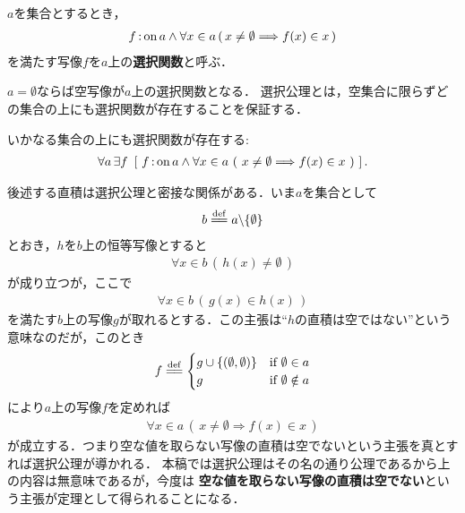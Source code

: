 	
	\begin{screen}
		\begin{dfn}[選択関数]
			$a$を集合とするとき，
			\begin{align}
				f \operatorname*{:on} a \wedge \forall x \in a\, (\, x \neq \emptyset \Longrightarrow f(x) \in x\, )
			\end{align}
			を満たす写像$f$を$a$上の{\bf 選択関数}と呼ぶ．
		\end{dfn}
	\end{screen}
	
	$a = \emptyset$ならば空写像が$a$上の選択関数となる．
	選択公理とは，空集合に限らずどの集合の上にも選択関数が存在することを保証する．
	
	\begin{screen}
		\begin{axm}[選択公理]
			いかなる集合の上にも選択関数が存在する:
			\begin{align}
				\forall a\, \exists f\ \left[\ 
				f \fon a \wedge \forall x \in a\ 
				(\ x \neq \emptyset \Longrightarrow f(x) \in x\ )\ \right]. 
			\end{align}
		\end{axm}
	\end{screen}
	
	後述する直積は選択公理と密接な関係がある．いま$a$を集合として
	\begin{align}
		b \defeq a \backslash \{\emptyset\}
	\end{align}
	とおき，$h$を$b$上の恒等写像とすると
	\begin{align}
		\forall x \in b\, (\, h(x) \neq \emptyset\, )
	\end{align}
	が成り立つが，ここで
	\begin{align}
		\forall x \in b\, (\, g(x) \in h(x)\, )
	\end{align}
	を満たす$b$上の写像$g$が取れるとする．この主張は``$h$の直積は空ではない''という意味なのだが，このとき
	\begin{align}
		f \defeq 
		\begin{cases}
			g \cup \{(\emptyset,\emptyset)\} & \mbox{if } \emptyset \in a \\
			g & \mbox{if } \emptyset \notin a
		\end{cases}
	\end{align}
	により$a$上の写像$f$を定めれば
	\begin{align}
		\forall x \in a\, (\, x \neq \emptyset \Longrightarrow f(x) \in x\, )
	\end{align}
	が成立する．つまり空な値を取らない写像の直積は空でないという主張を真とすれば選択公理が導かれる．
	本稿では選択公理はその名の通り公理であるから上の内容は無意味であるが，今度は
	{\bf 空な値を取らない写像の直積は空でない}という主張が定理として得られることになる．
	
